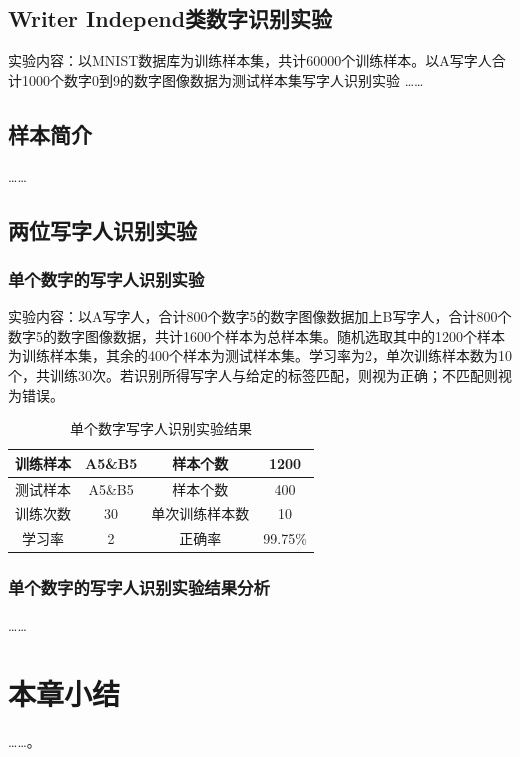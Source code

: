 \subsection{Writer Independ类数字识别实验}
实验内容：以MNIST数据库为训练样本集，共计60000个训练样本。以A写字人合计1000个数字0到9的数字图像数据为测试样本集写字人识别实验
……
\subsection{样本简介}
……
\subsection{两位写字人识别实验}
\subsubsection{单个数字的写字人识别实验}
实验内容：以A写字人，合计800个数字5的数字图像数据加上B写字人，合计800个数字5的数字图像数据，共计1600个样本为总样本集。随机选取其中的1200个样本为训练样本集，其余的400个样本为测试样本集。学习率为2，单次训练样本数为10个，共训练30次。若识别所得写字人与给定的标签匹配，则视为正确；不匹配则视为错误。
\begin{table}[]
    \centering
    \caption{单个数字写字人识别实验结果}
    \label{tab:3}
    \begin{tabular}{@{}cccc@{}}
        \toprule
        训练样本 & A5\&B5 & 样本个数    & 1200    \\ \midrule
        测试样本 & A5\&B5 & 样本个数    & 400     \\
        训练次数 & 30     & 单次训练样本数 & 10      \\
        学习率  & 2      & 正确率     & 99.75\% \\ \bottomrule
    \end{tabular}
\end{table}
\subsubsection{单个数字的写字人识别实验结果分析}

……
\section{本章小结}

……。
